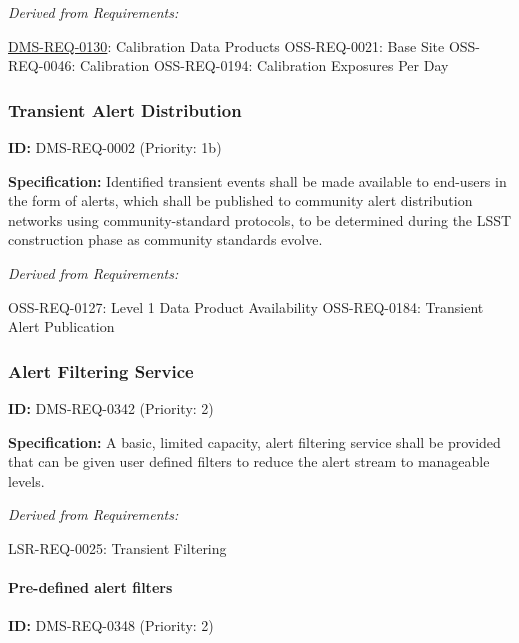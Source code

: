 \documentclass[SE,toc,lsstdraft]{lsstdoc}
\begin{document}
\emph{Derived from Requirements:}

\hyperref[DMS-REQ-0130]{DMS-REQ-0130}:
Calibration Data Products \newline
OSS-REQ-0021:
Base Site \newline
OSS-REQ-0046:
Calibration \newline
OSS-REQ-0194:
Calibration Exposures Per Day \newline

\subsubsection{Transient Alert Distribution}

\label{DMS-REQ-0002}
\textbf{ID:} DMS-REQ-0002 (Priority: 1b)

\textbf{Specification:} Identified transient events shall be made available to end-users in the form of alerts, which shall be published to community alert distribution networks using community-standard protocols, to be determined during the LSST construction phase as community standards evolve.

\emph{Derived from Requirements:}

OSS-REQ-0127:
Level 1 Data Product Availability \newline
OSS-REQ-0184:
Transient Alert Publication \newline

\subsubsection{Alert Filtering Service}

\label{DMS-REQ-0342}
\textbf{ID:} DMS-REQ-0342 (Priority: 2)

\textbf{Specification:} A basic, limited capacity, alert filtering service shall be provided that can be given user defined filters to reduce the alert stream to manageable levels.

\emph{Derived from Requirements:}

LSR-REQ-0025:
Transient Filtering \newline

\paragraph{Pre-defined alert filters}\hfill  %

\label{DMS-REQ-0348}
\textbf{ID:} DMS-REQ-0348 (Priority: 2)
\end{document}
